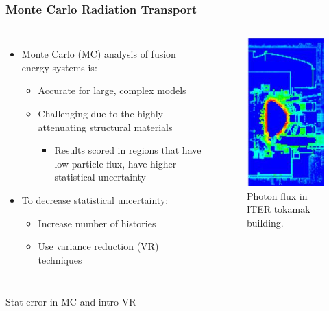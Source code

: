 \documentclass{beamer}
\begin{document}
\begin{frame}
\frametitle{Monte Carlo Radiation Transport}
\begin{columns}
\begin{itemize}
	\item{Monte Carlo (MC) analysis of fusion energy systems is:}
	\begin{itemize}
		\item{Accurate for large, complex models}
		\item{Challenging due to the highly attenuating structural materials}
                  \begin{itemize}
                  \item{Results scored in regions that have low particle flux, have higher statistical uncertainty}
                  \end{itemize}
	\end{itemize}
\item{To decrease statistical uncertainty:}
\begin{itemize}
\item{Increase number of histories}
\item{Use variance reduction (VR) techniques}
\end{itemize}
\end{itemize}

\begin{figure}
	\centering
	\includegraphics[scale=0.5]{iter_pflux.jpg}
	\caption{Photon flux in ITER tokamak building.}
\end{figure}

\end{columns}
\end{frame}

\begin{frame}{Stat error in MC and intro VR}
\end{frame}
\end{document}

